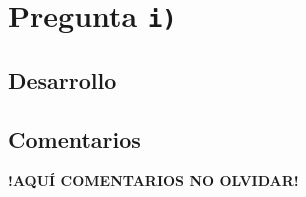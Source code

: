 \section{Pregunta \texttt{i)}}\label{pregunta-i}

\subsection{Desarrollo}

\FloatBarrier
\subsection{Comentarios}


\textbf{!AQUÍ COMENTARIOS NO OLVIDAR!}
